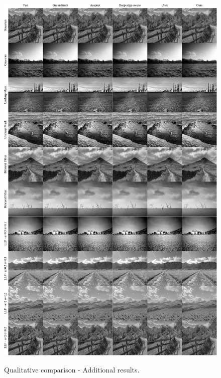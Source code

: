 \begin{figure}[ht]
  \centering

  {\includegraphics[width=0.8\linewidth]{Chapters/appendix-figs/landscape.pdf}}

   \caption{Qualitative comparison - Additional results.}
   \label{fig:appendix-DR-landscape}
\end{figure}

